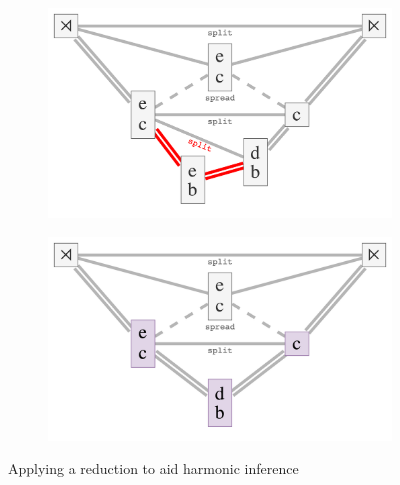 \documentclass[12pt,a4paper,twoside,openright]{report}
\theoremstyle{definition}
\begin{document}
\begin{figure}
  \begin{subfigure}[t]{.496\textwidth}
    \centering\includegraphics[keepaspectratio,width=\textwidth]{prep/harm/unreducedOuter.png}
    \caption{}
    \label{fig:pvHarmonyUnreducedOuter}
  \end{subfigure}
  \begin{subfigure}[t]{.496\textwidth}
    \centering\includegraphics[keepaspectratio,width=\textwidth]{prep/harm/reducedOuter.png}
    \caption{}
    \label{fig:pvHarmonyReducedOuter}
  \end{subfigure}

  \captionsetup{width=.9\linewidth}
  \caption{Applying a reduction to aid harmonic inference}
  \label{fig:pvHarmony}
\end{figure}

%
%
%
%
%
%
\end{document}
